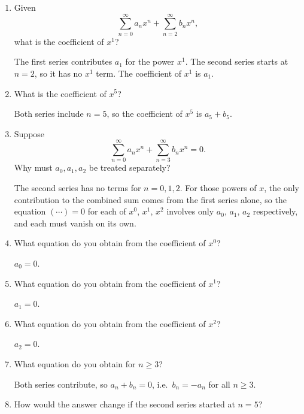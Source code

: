 \documentclass{self-check}
\begin{document}
\begin{enumerate}[leftmargin=*, itemsep=8pt]
\begin{answer}
    \end{answer}
  \item Given
    \[ \sum_{n=0}^{\infty}a_{n} x^{n} + \sum_{n=2}^{\infty}b_{n} x^{n}, \]
    what is the coefficient of \(x^{1}\)?
    \begin{answer}
      The first series contributes \(a_{1}\) for the power \(x^{1}\). The second series starts at \(n = 2\), so it has no \(x^{1}\) term. The coefficient of \(x^{1}\) is \(a_{1}\).
    \end{answer}
  \item What is the coefficient of \(x^{5}\)?
    \begin{answer}
      Both series include \(n = 5\), so the coefficient of \(x^{5}\) is \(a_{5} + b_{5}\).
    \end{answer}
  \item Suppose
    \[ \sum_{n=0}^{\infty}a_{n} x^{n} + \sum_{n=3}^{\infty}b_{n} x^{n} =0. \]
    Why must \(a_{0},a_{1},a_{2}\) be treated separately?
    \begin{answer}
      The second series has no terms for \(n = 0, 1, 2\). For those powers of \(x\), the only contribution to the combined sum comes from the first series alone, so the equation \((\cdots) = 0\) for each of \(x^{0}\), \(x^{1}\), \(x^{2}\) involves only \(a_{0}\), \(a_{1}\), \(a_{2}\) respectively, and each must vanish on its own.
    \end{answer}
  \item What equation do you obtain from the coefficient of \(x^{0}\)?
    \begin{answer}
      \(a_{0} = 0\).
    \end{answer}
  \item What equation do you obtain from the coefficient of \(x^{1}\)?
    \begin{answer}
      \(a_{1} = 0\).
    \end{answer}
  \item What equation do you obtain from the coefficient of \(x^{2}\)?
    \begin{answer}
      \(a_{2} = 0\).
    \end{answer}
  \item What equation do you obtain for \(n \ge 3\)?
    \begin{answer}
      Both series contribute, so \(a_{n} + b_{n} = 0\), i.e.\ \(b_{n} = -a_{n}\) for all \(n \ge 3\).
    \end{answer}
  \item How would the answer change if the second series started at \(n=5\)?

\end{enumerate}
\end{document}
